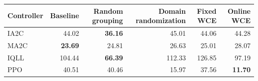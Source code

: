 \begin{tabular}{lrrrrr}
\hline
Controller & Baseline & Random grouping & Domain randomization & Fixed WCE & Online WCE \\
\hline
IA2C & 44.02 & \textbf{36.16} & 45.01 & 44.06 & 44.28 \\
MA2C & \textbf{23.69} & 24.81 & 26.63 & 25.01 & 28.07 \\
IQLL & 104.44 & \textbf{66.39} & 112.33 & 126.85 & 97.19 \\
PPO & 40.51 & 40.46 & 15.97 & 37.56 & \textbf{11.70} \\
\hline
\end{tabular}
